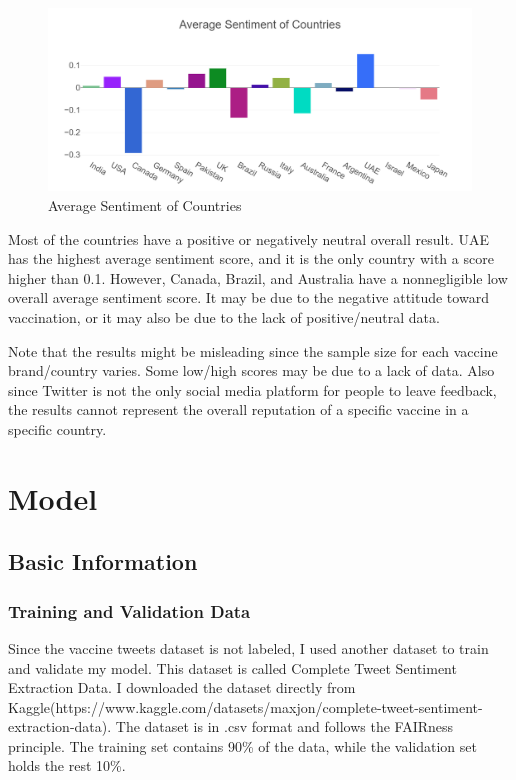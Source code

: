 \documentclass{article}
\begin{document}
\begin{figure}[H]
\centering
\includegraphics[width=15cm]{EDA3.png}
\caption{Average Sentiment of Countries}
\end{figure}

Most of the countries have a positive or negatively neutral overall result. UAE has the highest average sentiment score, and it is the only country with a score higher than 0.1. However, Canada, Brazil, and Australia have a nonnegligible low overall average sentiment score. It may be due to the negative attitude toward vaccination, or it may also be due to the lack of positive/neutral data.

Note that the results might be misleading since the sample size for each vaccine brand/country varies. Some low/high scores may be due to a lack of data. Also since Twitter is not the only social media platform for people to leave feedback, the results cannot represent the overall reputation of a specific vaccine in a specific country.

\section{Model}

\subsection{Basic Information}
\subsubsection{Training and Validation Data}
Since the vaccine tweets dataset is not labeled, I used another dataset to train and validate my model. This dataset is called Complete Tweet Sentiment Extraction Data. I downloaded the dataset directly from Kaggle(https://www.kaggle.com/datasets/maxjon/complete-tweet-sentiment-extraction-data). The dataset is in .csv format and follows the FAIRness principle. The training set contains 90\% of the data, while the validation set holds the rest 10\%.
\end{document}

